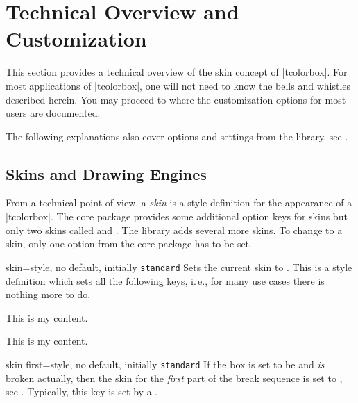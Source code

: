 \clearpage
\section{Technical Overview and Customization}\label{sec:technical}%
%
This section provides a technical overview of the skin concept of |tcolorbox|.
For most applications of |tcolorbox|, one will not need to know the bells and
whistles described herein.
You may proceed to  where the customization options
for most users are documented.

The following explanations also cover options and settings from the  library,
see  .

\subsection{Skins and Drawing Engines}\label{sec:skincorekeys}
From a technical point of view, a \emph{skin} is a style definition for the
appearance of a |tcolorbox|. The core package provides some additional
option keys for skins but only two skins called 
and .
The  library adds several more skins. To change to a skin, only one
option from the core package has to be set.

\begin{docTcbKey}{skin}{=}{style, no default, initially \texttt{standard}}
  Sets the current skin to . This is a style definition which sets all the following
  keys, i.\,e., for many use cases there is nothing more to do.
\begin{dispExample}

\begin{tcolorbox}[adjusted title=My title]
  This is my content.
\end{tcolorbox}
\begin{tcolorbox}[beamer,adjusted title=My title]
  This is my content.
\end{tcolorbox}
\end{dispExample}
\end{docTcbKey}

\begin{docTcbKey}{skin first}{=}{style, no default, initially \texttt{standard}}
  If the box is set to be  and \emph{is} broken actually,
  then the skin for the \emph{first} part of the break sequence
  is set to , see .
  Typically, this key is set by a .
\end{docTcbKey}


